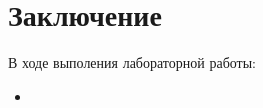 \chapter*{Заключение}

В ходе выполения лабораторной работы:

\begin{itemize}[left=\parindent]
        \item
\end{itemize}
